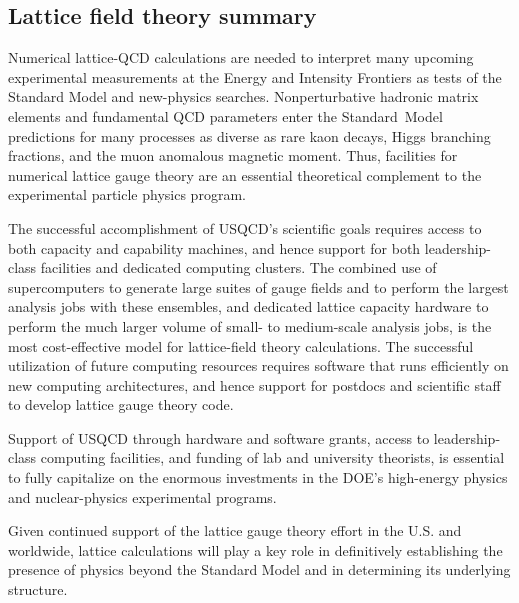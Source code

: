 \subsection{Lattice field theory summary}


Numerical lattice-QCD calculations are needed to interpret many upcoming
experimental measurements at the Energy and Intensity Frontiers as tests of
the Standard Model and new-physics searches.  Nonperturbative hadronic matrix
elements and fundamental QCD parameters enter the Standard~Model predictions
for many processes as diverse as rare kaon decays, Higgs branching fractions,
and the muon anomalous magnetic moment.  Thus, facilities for numerical
lattice gauge theory are an essential theoretical complement to the
experimental particle physics program.

The successful accomplishment of USQCD's scientific goals requires
access to both capacity and capability machines, and hence support for both
leadership-class facilities and dedicated computing clusters.  The combined
use of supercomputers to generate large suites of gauge fields and to perform
the largest analysis jobs with these ensembles, and dedicated lattice capacity
hardware to perform the much larger volume of small- to medium-scale analysis
jobs, is the most cost-effective model for lattice-field theory calculations.
The successful utilization of future computing resources requires software
that runs efficiently on new computing architectures, and hence support for
postdocs and scientific staff to develop lattice gauge theory code.

Support of USQCD through hardware and software grants, access to
leadership-class computing facilities, and funding of lab and university
theorists, is essential to fully capitalize on the enormous investments in the
DOE's high-energy physics and nuclear-physics experimental programs.

Given continued support of the lattice gauge theory effort in the U.S. and
worldwide, lattice calculations will play a key role in definitively
establishing the presence of physics beyond the Standard Model and in
determining its underlying structure.
